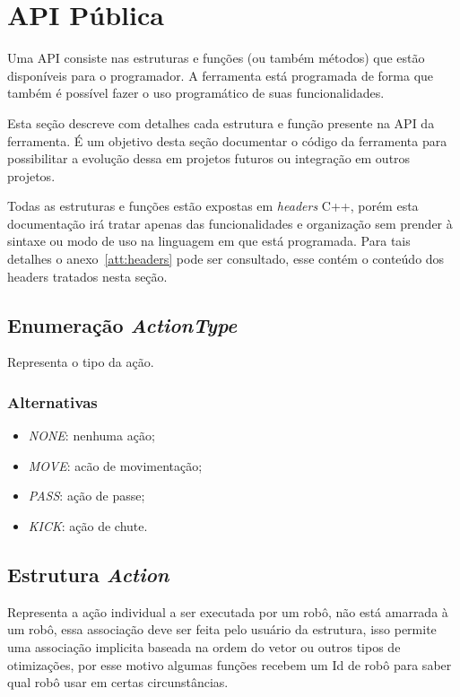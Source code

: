 \section{API Pública}


Uma API consiste nas estruturas e funções (ou também métodos) que estão
disponíveis para o programador.  A ferramenta está programada de forma que
também é possível fazer o uso programático de suas funcionalidades.

Esta seção descreve com detalhes cada estrutura e função presente na API da
ferramenta.  É um objetivo desta seção documentar o código da ferramenta para
possibilitar a evolução dessa em projetos futuros ou integração em outros
projetos.

Todas as estruturas e funções estão expostas em \textit{headers} C++, porém esta
documentação irá tratar apenas das funcionalidades e organização sem prender à
sintaxe ou modo de uso na linguagem em que está programada.  Para tais detalhes
o anexo~\ref{att:headers} pode ser consultado, esse contém o conteúdo dos
headers tratados nesta seção.

\subsection*{Enumeração \textit{ActionType}}

Representa o tipo da ação.

\subsubsection*{Alternativas}

\begin{itemize}
  \item \textit{NONE}: nenhuma ação;
  \item \textit{MOVE}: acão de movimentação;
  \item \textit{PASS}: ação de passe;
  \item \textit{KICK}: ação de chute.
\end{itemize}

\subsection*{Estrutura \textit{Action}}

Representa a ação individual a ser executada por um robô, não está amarrada à um
robô, essa associação deve ser feita pelo usuário da estrutura, isso permite uma
associação implicita baseada na ordem do vetor ou outros tipos de otimizações,
por esse motivo algumas funções recebem um Id de robô para saber qual robô usar
em certas circunstâncias.

